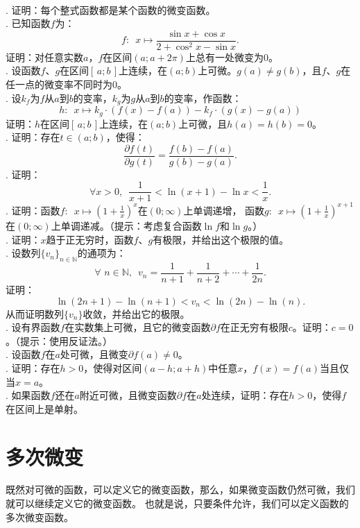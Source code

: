 \documentclass[12pt,UTF8,fontset=none]{ctexbook}
\begin{document}
\begin{xt}
    \mbox{} \\
    . 证明：每个整式函数都是某个函数的微变函数。\\
    . 已知函数$f$为：
    $$ f: \,\,\, x\mapsto \frac{\sin{x} + \cos{x}}{2 + \cos^2{x} - \sin{x}}.$$
    \indent 证明：对任意实数$a$，$f$在区间$(a; a + 2\pi)$上总有一处微变为$0$。\\
    . 设函数$f$、$g$在区间$[\,a; b\,]$上连续，在$(a; b)$上可微。$g(a) \neq g(b)$，且$f$、$g$在任一点的微变率不同时为$0$。\\
    . 设$k_f$为$f$从$a$到$b$的变率，$k_g$为$g$从$a$到$b$的变率，作函数：
    $$ h : \,\,\, x \mapsto k_g \cdot (f(x) - f(a)) - k_f \cdot (g(x) - g(a))$$
    \indent 证明：$h$在区间$[\,a; b\,]$上连续，在$(a; b)$上可微，且$h(a) = h(b) = 0$。\\
    . 证明：存在$t\in(a; b)$，使得：
    $$ \frac{\partial f (t)}{\partial g (t)} = \frac{f(b) - f(a)}{g(b) - g(a)}.$$
    . 证明：
    $$ \forall x > 0, \,\,\, \frac{1}{x+1} < \ln{(x+1)} - \ln{x} < \frac{1}{x}.$$
    . 证明：函数$f: \,\,\,x \mapsto \left(1 + \frac{1}{x}\right)^x$在$(0;\infty)$上单调递增，
    函数$g: \,\,\,x \mapsto \left(1 + \frac{1}{x}\right)^{x+1}$在$(0;\infty)$上单调递减。（提示：考虑复合函数$\ln{f}$和$\ln{g}$。）\\
    . 证明：$x$趋于正无穷时，函数$f$、$g$有极限，并给出这个极限的值。\\
    . 设数列$\{v_n\}_{n\in\mathbb{N}}$的通项为：
    $$ \forall \,\, n\in\mathbb{N},\,\,\, v_n = \frac{1}{n+1} + \frac{1}{n+2} + \cdots + \frac{1}{2n}. $$
    证明：
    $$ \ln{(2n + 1)} - \ln{(n + 1)}  < v_n < \ln{(2n)} - \ln{(n)}. $$
    从而证明数列$\{v_n\}$收敛，并给出它的极限。\\
    . 设有界函数$f$在实数集上可微，且它的微变函数$\partial f$在正无穷有极限$c$。证明：$c = 0$。（提示：使用反证法。）\\
    . 设函数$f$在$a$处可微，且微变$\partial f(a) \neq 0$。\\
    . 证明：存在$h>0$，使得对区间$(a-h;a+h)$中任意$x$，$f(x) = f(a)$当且仅当$x = a$。\\
    . 如果函数$f$还在$a$附近可微，且微变函数$\partial f$在$a$处连续，证明：存在$h>0$，使得$f$在区间上是单射。

\end{xt}

\section{多次微变}
既然对可微的函数，可以定义它的微变函数，那么，如果微变函数仍然可微，我们就可以继续定义它的微变函数。
也就是说，只要条件允许，我们可以定义函数的多次微变函数。
\end{document}
